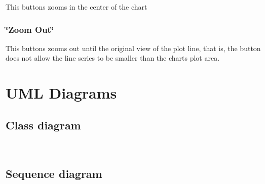 This buttons zooms in the center of the chart ~\newline
\hypertarget{index_button5}{}\subsubsection{\char`\"{}\+Zoom Out\char`\"{}}\label{index_button5}
This buttons zooms out until the original view of the plot line, that is, the button does not allow the line series to be smaller than the chart\textquotesingle{}s plot area. ~\newline
 ~\newline
 ~\newline
\hypertarget{index_diagrams_sec}{}\section{U\+M\+L Diagrams}\label{index_diagrams_sec}
\hypertarget{index_class_diag}{}\subsection{Class diagram}\label{index_class_diag}
~\newline
 ~\newline
\hypertarget{index_sequence_diag}{}\subsection{Sequence diagram}\label{index_sequence_diag}
